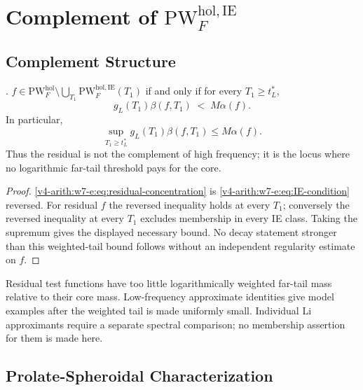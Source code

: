 \section{Complement of \(\mathrm{PW}^{\mathrm{hol},\mathrm{IE}}_{F}\)}
\label{v4-arith:w7-e:residual}

\subsection{Complement Structure}
\label{v4-arith:w7-e:complement}

\begin{theorem}
\label{v4-arith:w7-e:thm:IE-residual}
\ClaimStatusProvedHere. \(f\in\mathrm{PW}^{\mathrm{hol}}_{F}\setminus\bigcup_{T_{1}}\mathrm{PW}^{\mathrm{hol},\mathrm{IE}}_{F}(T_{1})\)
if and only if for every \(T_{1}\geq t_{L}^{\ast}\),
\begin{equation}
\label{v4-arith:w7-e:eq:residual-concentration}
g_{L}(T_{1})\beta(f,T_{1})\;<\;M\alpha(f).
\end{equation}
In particular,
\[
\sup_{T_{1}\geq t_{L}^{\ast}}g_{L}(T_{1})\beta(f,T_{1})\leq M\alpha(f).
\]
Thus the residual is not the complement of high frequency; it is the
locus where no logarithmic far-tail threshold pays for the core.
\end{theorem}

\begin{proof}
\eqref{v4-arith:w7-e:eq:residual-concentration} is
\eqref{v4-arith:w7-e:eq:IE-condition} reversed. For residual \(f\) the
reversed inequality holds at every \(T_{1}\); conversely the reversed
inequality at every \(T_{1}\) excludes membership in every IE class.
Taking the supremum gives the displayed necessary bound. No decay statement
stronger than this weighted-tail bound follows without an independent
regularity estimate on \(f\).
\end{proof}

\begin{remark}
\label{v4-arith:w7-e:rem:residual-characterization}
Residual test functions have too little logarithmically weighted
far-tail mass relative to their core mass. Low-frequency approximate
identities give model examples after the weighted tail is made
uniformly small. Individual Li approximants require a separate
spectral comparison; no membership assertion for them is made here.
\end{remark}

\subsection{Prolate-Spheroidal Characterization}
\label{v4-arith:w7-e:prolate}

